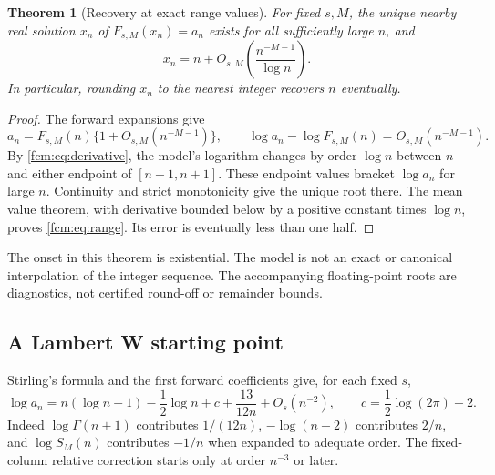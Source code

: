 \documentclass[11pt,letterpaper]{article}
\newtheorem{theorem}{Theorem}[section]
\theoremstyle{remark}\newtheorem{remark}[theorem]{Remark}
\begin{document}
\begin{theorem}[Recovery at exact range values]\label{fcm:thm:range}
For fixed $s,M$, the unique nearby real solution $x_n$ of $F_{s,M}(x_n)=a_n$ exists for all sufficiently large $n$, and
\begin{equation}\label{fcm:eq:range}
 x_n=n+O_{s,M}\left(\frac{n^{-M-1}}{\log n}\right).
\end{equation}
In particular, rounding $x_n$ to the nearest integer recovers $n$ eventually.
\end{theorem}
\begin{proof}
The forward expansions give
\[
 a_n=F_{s,M}(n)\{1+O_{s,M}(n^{-M-1})\},\qquad
 \log a_n-\log F_{s,M}(n)=O_{s,M}(n^{-M-1}).
\]
By \eqref{fcm:eq:derivative}, the model's logarithm changes by order $\log n$ between $n$ and either endpoint of $[n-1,n+1]$. These endpoint values bracket $\log a_n$ for large $n$. Continuity and strict monotonicity give the unique root there. The mean value theorem, with derivative bounded below by a positive constant times $\log n$, proves \eqref{fcm:eq:range}. Its error is eventually less than one half.
\end{proof}
The onset in this theorem is existential. The model is not an exact or canonical interpolation of the integer sequence. The accompanying floating-point roots are diagnostics, not certified round-off or remainder bounds.

\subsection{A Lambert W starting point}
Stirling's formula and the first forward coefficients give, for each fixed $s$,
\begin{equation}\label{fcm:eq:log}
 \log a_n=n(\log n-1)-\frac12\log n+c+\frac{13}{12n}+O_s(n^{-2}),
 \qquad c=\frac12\log(2\pi)-2.
\end{equation}
Indeed $\log\Gamma(n+1)$ contributes $1/(12n)$, $-\log(n-2)$ contributes $2/n$, and $\log S_M(n)$ contributes $-1/n$ when expanded to adequate order. The fixed-column relative correction starts only at order $n^{-3}$ or later.
\end{document}
